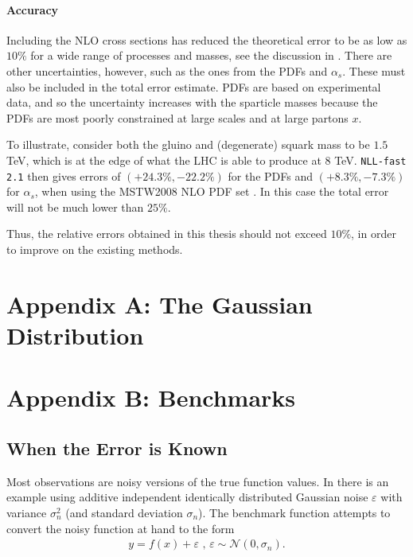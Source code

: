 \documentclass[twoside,english]{uiofysmaster}
\begin{document}
\subsubsection{Accuracy}

Including the NLO cross sections has reduced the theoretical error to be as low as $10 \%$ for a wide range of processes and masses, see the discussion in \cite{balazs2017colliderbit}. There are other uncertainties, however, such as the ones from the PDFs and $\alpha_s$. These must also be included in the total error estimate. PDFs are based on experimental data, and so the uncertainty increases with the sparticle masses because the PDFs are most poorly constrained at large scales and at large partons $x$.

To illustrate, consider both the gluino and (degenerate) squark mass to be $1.5$ TeV, which is at the edge of what the LHC is able to produce at 8 TeV. \verb|NLL-fast 2.1| then gives errors of $(+24.3 \%, -22.2\%)$ for the PDFs and $(+8.3 \%, -7.3 \%)$ for $\alpha_s$, when using the MSTW2008 NLO PDF
set \cite{Martin:2009iq}. In this case the total error will not be much lower than $25 \%$. 

Thus, the relative errors obtained in this thesis should not exceed $10 \%$, in order to improve on the existing methods.















\chapter*{Appendix A: The Gaussian Distribution}





\chapter*{Appendix B: Benchmarks}

\section{When the Error is Known}

Most observations are noisy versions of the true function values. In \cite{rasmussen2006gaussian} there is an example using additive independent identically distributed Gaussian noise $\varepsilon$ with variance $\sigma_n^2$ (and standard deviation $\sigma_n$). The benchmark function attempts to convert the noisy function at hand to the form
\begin{align}\label{Eq:: Gaussian noise}
y = f(x) + \varepsilon \text{ , } \varepsilon \sim  \mathcal{N} (0, \sigma_n).
\end{align}
\end{document}
